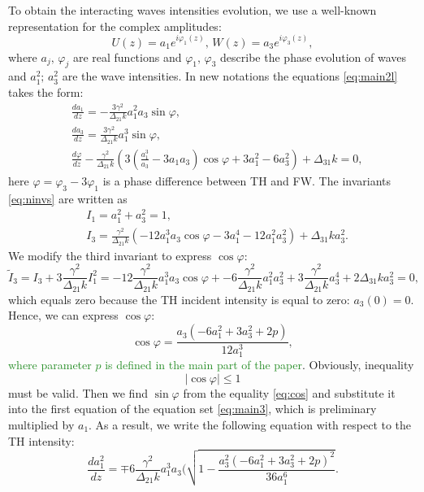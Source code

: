 \documentclass[a4paper, 12pt, onecolumn]{extarticle}
\begin{document}
To obtain the interacting waves intensities evolution, we use a well-known representation for the complex amplitudes:
\begin{equation}
\label{eq:repr}
U(z)=a_1e^{i\varphi_1(z)},\,W(z)=a_3e^{i\varphi_3(z)},
\end{equation}
where \(a_j,\,\varphi_j\) are real functions and \(\varphi_1,\,\varphi_3\) describe the phase evolution of waves and \(a_1^2;\, a_3^2\) are the wave intensities. In new notations the equations \eqref{eq:main2l} takes the form:
\begin{equation}
\label{eq:main3}
\begin{aligned}
&\frac{da_1}{dz}=-\frac{3\gamma^2}{\Delta_{21}k}a_1^2a_3\sin\varphi,\\
&\frac{da_3}{dz}=\frac{3\gamma^2}{\Delta_{21}k}a_1^3\sin\varphi,\\
&\frac{d\varphi}{dz}-\frac{\gamma^2}{\Delta_{21}k}\left(3\left(\frac{a_1^3}{a_3}-3a_1a_3\right)\cos\varphi+3a_1^2-6a_3^2\right)+\Delta_{31}k=0,
\end{aligned}
\end{equation}
here \(\varphi=\varphi_3-3\varphi_1\) is a phase difference between TH and FW. The invariants \eqref{eq:ninvs} are written as
\[
\begin{aligned}
&I_1=a_1^2+a_3^2=1,\\
&I_3=\frac{\gamma^2}{\Delta_{21}k}\left(-12a_1^3a_3\cos\varphi-3a_1^4-12a_1^2a_3^2\right)+\Delta_{31}ka_3^2.
\end{aligned}
\]
We modify the third invariant to express \(\cos \varphi\):
\[
\tilde{I}_3=I_3+3\frac{\gamma^2}{\Delta_{21}k}I_1^2=-12\frac{\gamma^2}{\Delta_{21}k}a_1^3a_3\cos\varphi+-6\frac{\gamma^2}{\Delta_{21}k}a_1^2a_3^2+3\frac{\gamma^2}{\Delta_{21}k}a_3^4+2\Delta_{31}ka_3^2=0,
\]
which equals zero because the TH incident intensity is equal to zero: \(a_3(0)=0\). Hence, we can express \(\cos \varphi\):
\begin{equation}
\label{eq:cos}
\cos\varphi=\frac{a_3(-6a_1^2+3a_3^2+2p)}{12a_1^3},
\end{equation}
\textcolor{ForestGreen}{where parameter $p$ is defined in the main part of the paper}. Obviously,  inequality 
\[
|\cos\varphi|\le1
\]
 must be valid. Then we find \(\sin \varphi\) from the equality \eqref{eq:cos} and substitute it into the first equation of the equation set \eqref{eq:main3}, which is preliminary multiplied by \(a_1\). As a result, we write the following equation with respect to the TH intensity:
\[\frac{da_1^2}{dz}=\mp6\frac{\gamma^2}{\Delta_{21}k}a_1^3a_3(\sqrt{1-\frac{a_3^2(-6a_1^2+3a_3^2+2p)^2}{36a_1^6}}.\]
\end{document}
